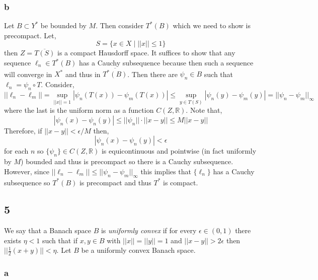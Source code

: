 \documentclass[12pt]{article}
\newcommand{\R}{\mathbb{R}}
\begin{document}
\subsubsection{b}

Let $B \subset Y^*$ be bounded by $M$. Then consider $T^*(B)$ which we need to show is precompact. Let,
\[ S = \{ x \in X \mid || x || \le 1 \} \]
then $Z = \overline{T(S)}$ is a compact Hausdorff space. It suffices to show that any sequence $\ell_n \in T^*(B)$ has a Cauchy subsequence because then such a sequence will converge in $X^*$ and thus in $\overline{T^*(B)}$. Then there are $\psi_n \in B$ such that $\ell_n = \psi_n \circ T$. Consider,
\[ || \ell_n - \ell_m || = \sup_{|| x || = 1} | \psi_n(T(x)) - \psi_m(T(x)) | \le \sup_{y \in T(S)} | \psi_n(y) - \psi_m(y) | = || \psi_n - \psi_m ||_{\infty} \]
where the last is the uniform norm as a function $C(Z, \R)$. Note that,
\[ | \psi_n(x) - \psi_n(y) | \le || \psi_n || \cdot || x - y || \le M || x - y || \] 
Therefore, if $|| x - y || < \epsilon/M$ then,
\[ | \psi_n(x) - \psi_n(y) | < \epsilon \]
for each $n$ so $\{ \psi_n \} \in C(Z, \R)$ is equicontinuous and pointwise (in fact uniformly by $M$) bounded and thus is precompact so there is a Cauchy subsequence. However, since $|| \ell_n - \ell_m || \le || \psi_n - \psi_m ||_{\infty}$ this implies that $\{ \ell_n \}$ has a Cauchy subsequence so $T^*(B)$ is precompact and thus $T^*$ is compact.


\subsection{5}

We say that a Banach space $B$ is \textit{uniformly convex} if for every $\epsilon \in (0,1)$ there exists $\eta < 1$ such that if $x,y \in B$ with $||x|| = ||y|| = 1$ and $|| x - y || > 2 \epsilon$ then $|| \tfrac{1}{2}(x + y) || < \eta$. Let $B$ be a uniformly convex Banach space.

\subsubsection{a}
\end{document}

